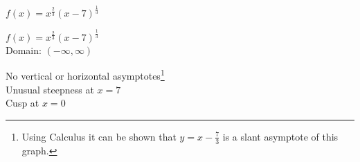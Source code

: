 {$f(x) = x^{\frac{2}{3}}(x - 7)^{\frac{1}{3}}$}
{$f(x) = x^{\frac{2}{3}}(x - 7)^{\frac{1}{3}}$\\
Domain: $(-\infty, \infty)$\\
\begin{center}
\end{center}

No vertical or horizontal asymptotes\footnote{Using Calculus it can be shown that $y = x - \frac{7}{3}$ is a slant asymptote of this graph.}\\
Unusual steepness at $x = 7$\\
Cusp at $x = 0$\\

\begin{center}
\end{center}}



